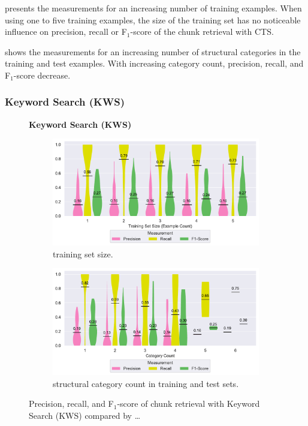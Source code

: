  presents the
measurements for an
increasing number of training examples.
When using one to five
training examples, the size of the training set has no noticeable
influence on precision, recall or F$_{1}$-score of the chunk retrieval
with CTS.

 shows the
measurements for an increasing number of structural categories in the
training and test examples.
With increasing category count, precision,
recall, and F$_{1}$-score decrease.

\subsubsection{Keyword Search (KWS)}
\label{sec:r:kws}
\begin{figure}
\centering
    \textbf{Keyword Search (KWS)}\par\medskip
\begin{subfigure}[b]{\columnwidth}
		\centering
		\includegraphics[width=0.8\columnwidth,
		clip]{img/big-study/recall-precision-examplecount-KWS.pdf}
		\caption{training set size.}
		\label{fig:recall-precision-examplecount-KWS}
\end{subfigure}\hspace{\fill}
\begin{subfigure}[b]{\columnwidth}
		\centering
		\includegraphics[width=0.8\columnwidth,
		clip]{img/big-study/recall-precision-categorycount-KWS.pdf}
		\caption{structural category count
		in training and test sets.}
		\label{fig:recall-precision-categorycount-KWS}
\end{subfigure}
\caption{Precision, recall, and F$_{1}$-score of chunk retrieval with
Keyword Search (KWS) compared by \ldots}
\label{fig:results-KWS}
\end{figure}


